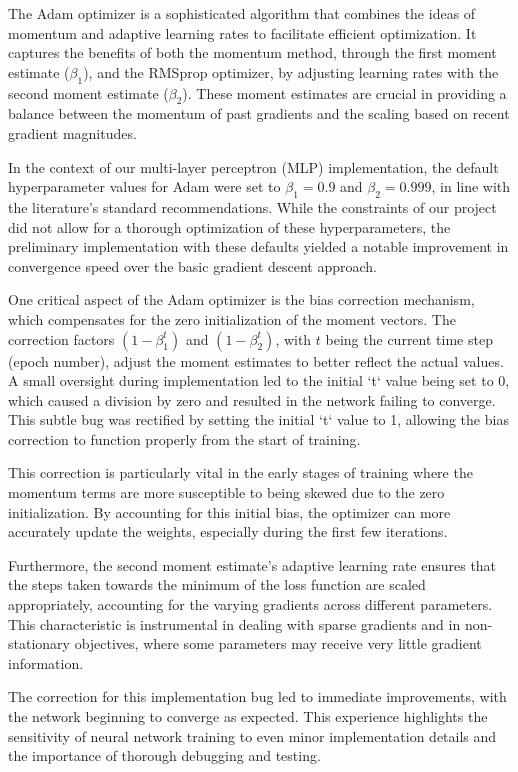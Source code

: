 \documentclass[letterpaper]{article}
\begin{document}
The Adam optimizer is a sophisticated algorithm that combines the ideas of momentum and adaptive learning rates to facilitate efficient optimization. It captures the benefits of both the momentum method, through the first moment estimate (\(\beta_1\)), and the RMSprop optimizer, by adjusting learning rates with the second moment estimate (\(\beta_2\)). These moment estimates are crucial in providing a balance between the momentum of past gradients and the scaling based on recent gradient magnitudes.

In the context of our multi-layer perceptron (MLP) implementation, the default hyperparameter values for Adam were set to \(\beta_1=0.9\) and \(\beta_2=0.999\), in line with the literature's standard recommendations. While the constraints of our project did not allow for a thorough optimization of these hyperparameters, the preliminary implementation with these defaults yielded a notable improvement in convergence speed over the basic gradient descent approach.

One critical aspect of the Adam optimizer is the bias correction mechanism, which compensates for the zero initialization of the moment vectors. The correction factors \( (1 - \beta_1^t) \) and \( (1 - \beta_2^t) \), with \( t \) being the current time step (epoch number), adjust the moment estimates to better reflect the actual values. A small oversight during implementation led to the initial `t` value being set to 0, which caused a division by zero and resulted in the network failing to converge. This subtle bug was rectified by setting the initial `t` value to 1, allowing the bias correction to function properly from the start of training.

This correction is particularly vital in the early stages of training where the momentum terms are more susceptible to being skewed due to the zero initialization. By accounting for this initial bias, the optimizer can more accurately update the weights, especially during the first few iterations.

Furthermore, the second moment estimate's adaptive learning rate ensures that the steps taken towards the minimum of the loss function are scaled appropriately, accounting for the varying gradients across different parameters. This characteristic is instrumental in dealing with sparse gradients and in non-stationary objectives, where some parameters may receive very little gradient information.

The correction for this implementation bug led to immediate improvements, with the network beginning to converge as expected. This experience highlights the sensitivity of neural network training to even minor implementation details and the importance of thorough debugging and testing.
\end{document}
